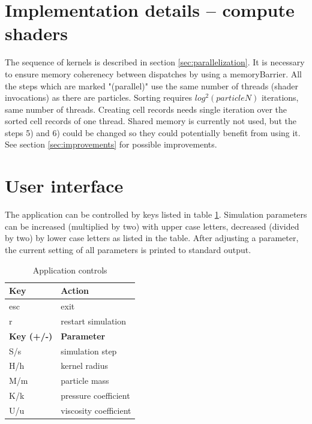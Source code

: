 \documentclass[a4paper,report]{IEEEtran}
\begin{document}
\section{Implementation details -- compute shaders}
The sequence of kernels is described in section \ref{sec:parallelization}. It is necessary to ensure memory coherenecy between dispatches by using a memoryBarrier. All the steps which are marked "(parallel)" use the same number of threads (shader invocations) as there are particles. Sorting requires $log^2(particleN)$ iterations, same number of threads. Creating cell records needs single iteration over the sorted cell records of one thread. Shared memory is currently not used, but the steps 5) and 6) could be changed so they could potentially benefit from using it. See section \ref{sec:improvements} for possible improvements.

\section{User interface}
The application can be controlled by keys listed in table \ref{table:controls}. Simulation parameters can be increased (multiplied by two) with upper case letters, decreased (divided by two) by lower case letters as listed in the table. After adjusting a parameter, the current setting of all parameters is printed to standard output.
\begin{table}[h]
	\normalsize
	\centering
	\begin{tabular}{|l|l|}
		\hline
		\textbf{Key} & \textbf{Action} \\
		\hline
		\hline
		esc & exit \\
		r & restart simulation \\
		\hline
		\hline
		\textbf{Key (+/-)} & \textbf{Parameter} \\
		\hline
		\hline
		S/s & simulation step \\
		H/h & kernel radius \\
		M/m & particle mass \\
		K/k & pressure coefficient \\
		U/u & viscosity coefficient \\
		\hline
	\end{tabular}
	\caption{Application controls}
	\label{table:controls}
\end{table}
\end{document}
